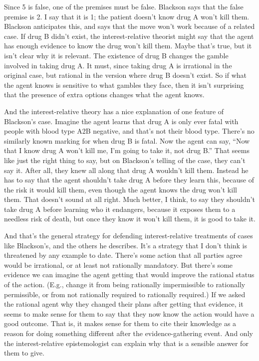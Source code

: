 \documentclass[
  11pt,
  letterpaper,
  DIV=11,
  numbers=noendperiod,
  twoside]{scrartcl}
\begin{document}
Since 5 is false, one of the premises must be false. Blackson says that
the false premise is 2. I say that it is 1; the patient doesn't know
drug A won't kill them. Blackson anticipates this, and says that the
move won't work because of a related case. If drug B didn't exist, the
interest-relative theorist might say that the agent has enough evidence
to know the drug won't kill them. Maybe that's true, but it isn't clear
why it is relevant. The existence of drug B changes the gamble involved
in taking drug A. It must, since taking drug A is irrational in the
original case, but rational in the version where drug B doesn't exist.
So if what the agent knows is sensitive to what gambles they face, then
it isn't surprising that the presence of extra options changes what the
agent knows.

And the interest-relative theory has a nice explanation of one feature
of Blackson's case. Imagine the agent learns that drug A is only ever
fatal with people with blood type A2B negative, and that's not their
blood type. There's no similarly known marking for when drug B is fatal.
Now the agent can say, ``Now that I know drug A won't kill me, I'm going
to take it, not drug B.'' That seems like just the right thing to say,
but on Blackson's telling of the case, they can't say it. After all,
they knew all along that drug A wouldn't kill them. Instead he has to
say that the agent shouldn't take drug A before they learn this, because
of the risk it would kill them, even though the agent knows the drug
won't kill them. That doesn't sound at all right. Much better, I think,
to say they shouldn't take drug A before learning who it endangers,
because it exposes them to a needless risk of death, but once they know
it won't kill them, it is good to take it.

And that's the general strategy for defending interest-relative
treatments of cases like Blackson's, and the others he describes. It's a
strategy that I don't think is threatened by any example to date.
There's some action that all parties agree would be irrational, or at
least not rationally mandatory. But there's some evidence we can imagine
the agent getting that would improve the rational status of the action.
(E.g., change it from being rationally impermissible to rationally
permissible, or from not rationally required to rationally required.) If
we asked the rational agent why they changed their plans after getting
that evidence, it seems to make sense for them to say that they now know
the action would have a good outcome. That is, it makes sense for them
to cite their knowledge as a reason for doing something different after
the evidence-gathering event. And only the interest-relative
epistemologist can explain why that is a sensible answer for them to
give.
\end{document}
